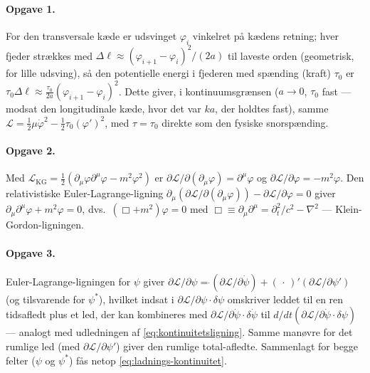 \paragraph{Opgave 1.} For den transversale kæde er udsvinget
$\varphi_i$ vinkelret på kædens retning; hver fjeder strækkes med
$\Delta\ell\approx(\varphi_{i+1}-\varphi_i)^2/(2a)$ til laveste orden
(geometrisk, for lille udsving), så den potentielle energi i
fjederen med spænding (kraft) $\tau_0$ er
$\tau_0\Delta\ell\approx\frac{\tau_0}{2a}(\varphi_{i+1}-\varphi_i)^2$.
Dette giver, i kontinuumsgrænsen ($a\to0$, $\tau_0$ fast — modsat den
longitudinale kæde, hvor det var $ka$, der holdtes fast), samme
$\mathcal{L}=\frac12\mu\dot\varphi^2-\frac12\tau_0(\varphi')^2$, med
$\tau=\tau_0$ direkte som den fysiske snorspænding.

\paragraph{Opgave 2.} Med
$\mathcal{L}_\text{KG}=\frac12(\partial_\mu\varphi\partial^\mu\varphi-m^2\varphi^2)$
er $\partial\mathcal{L}/\partial(\partial_\mu\varphi)=\partial^\mu\varphi$
og $\partial\mathcal{L}/\partial\varphi=-m^2\varphi$. Den relativistiske
Euler-Lagrange-ligning $\partial_\mu(\partial\mathcal{L}/\partial(\partial_\mu\varphi))-\partial\mathcal{L}/\partial\varphi=0$
giver $\partial_\mu\partial^\mu\varphi+m^2\varphi=0$, dvs.\
$(\Box+m^2)\varphi=0$ med $\Box\equiv\partial_\mu\partial^\mu=\partial_t^2/c^2-\nabla^2$
— Klein-Gordon-ligningen.

\paragraph{Opgave 3.} Euler-Lagrange-ligningen for $\psi$ giver
$\partial\mathcal{L}/\partial\psi=\dot{}(\partial\mathcal{L}/\partial\dot\psi)+(\,\cdot\,)'(\partial\mathcal{L}/\partial\psi')$
(og tilsvarende for $\psi^\ast$), hvilket indsat i
$\partial\mathcal{L}/\partial\psi\cdot\delta\psi$ omskriver leddet til
en ren tidsafledt plus et led, der kan kombineres med
$\partial\mathcal{L}/\partial\dot\psi\cdot\delta\dot\psi$ til
$d/dt(\partial\mathcal{L}/\partial\dot\psi\cdot\delta\psi)$ — analogt
med udledningen af \eqref{eq:kontinuitetsligning}. Samme manøvre for
det rumlige led (med $\partial\mathcal{L}/\partial\psi'$) giver den
rumlige total-afledte. Sammenlagt for begge felter ($\psi$ og
$\psi^\ast$) fås netop \eqref{eq:ladnings-kontinuitet}.

